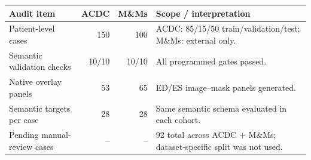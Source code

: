 \setcounter{table}{0}\label{tab:cohort_qc_evidence}
\begin{tabularx}{\linewidth}{lrrX}
\toprule
Audit item & ACDC & M\&Ms & Scope / interpretation \\
\midrule
Patient-level cases & 150 & 100 & ACDC: 85/15/50 train/validation/test; M\&Ms: external only. \\
Semantic validation checks & 10/10 & 10/10 & All programmed gates passed. \\
Native overlay panels & 53 & 65 & ED/ES image--mask panels generated. \\
Semantic targets per case & 28 & 28 & Same semantic schema evaluated in each cohort. \\
Pending manual-review cases & -- & -- & 92 total across ACDC + M\&Ms; dataset-specific split was not used. \\
\bottomrule
\end{tabularx}
